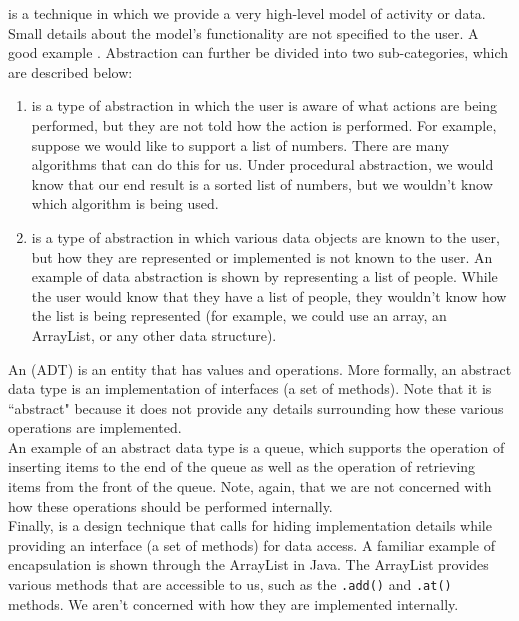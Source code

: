  is a technique in which we provide a very high-level model of activity or data. Small details about the model's functionality are not specified to the user. A good example . Abstraction can further be divided into two sub-categories, which are described below:
\begin{enumerate}
    \item {} is a type of abstraction in which the user is aware of what actions are being performed, but they are not told how the action is performed. For example, suppose we would like to support a list of numbers. There are many algorithms that can do this for us. Under procedural abstraction, we would know that our end result is a sorted list of numbers, but we wouldn't know which algorithm is being used.
    \item {} is a type of abstraction in which various data objects are known to the user, but how they are represented or implemented is not known to the user. An example of data abstraction is shown by representing a list of people. While the user would know that they have a list of people, they wouldn't know how the list is being represented (for example, we could use an array, an ArrayList, or any other data structure).
\end{enumerate}

An  (ADT) is an entity that has values and operations. More formally, an abstract data type is an implementation of interfaces (a set of methods). 
Note that it is ``abstract" because it does not provide any details surrounding how these various operations are implemented. \\

An example of an abstract data type is a queue, which supports the operation of inserting items to the end of the queue as well as the operation of retrieving items from the front of the queue. Note, again, that we are not concerned with how these operations should be performed internally. \\

Finally,  is a design technique that calls for hiding implementation details while providing an interface (a set of methods) for data access. A familiar example of encapsulation is shown through the ArrayList in Java. The ArrayList provides various methods that are accessible to us, such as the \verb!.add()! and \verb!.at()! methods. We aren't concerned with how they are implemented internally.


